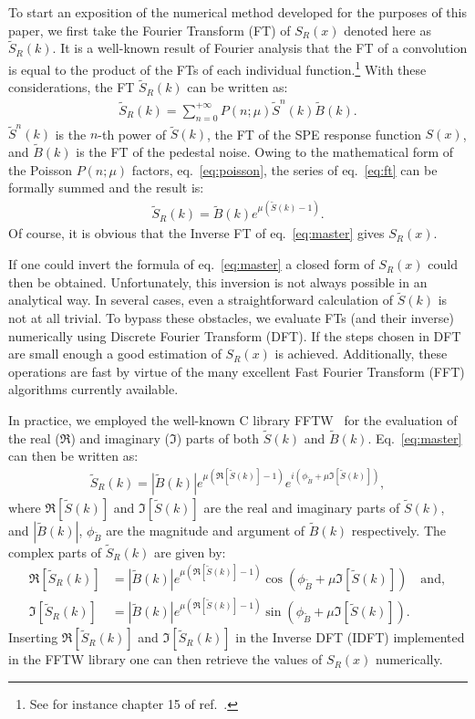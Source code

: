 \documentclass[a4paper,11pt]{article}
\begin{document}
To start an exposition of the numerical method developed for the purposes of this paper, we first take the Fourier Transform (FT) of $S_R(x)$ denoted here as $\tilde S_R(k)$. 
It is a well-known result of Fourier analysis that the FT of a convolution is equal to the product of the FTs of each individual function.\footnote{%
See for instance chapter 15 of ref.~\cite{Arfken}. }
With these considerations, the FT $\tilde S_R(k)$ can be written as: 
\begin{align}
\tilde S_R(k) = \sum_{n=0}^{+\infty} P( n; \mu ) \tilde S^n(k)  \tilde B(k). 
\label{eq:ft}
\end{align}
$\tilde S^n(k)$ is the $n$-th power of $\tilde S(k)$, the FT of the SPE response function $S(x)$, and $ \tilde B(k)$ is the FT of the pedestal noise. 
Owing to the mathematical form of the Poisson $P( n; \mu )$ factors, eq.~\eqref{eq:poisson}, the series of eq.~\eqref{eq:ft} can be formally summed and the result is: 
\begin{align}
\tilde S_R(k) =\tilde B(k) e^{\mu ( \tilde S(k) - 1 )}. 
\label{eq:master}
\end{align}
Of course, it is obvious that the Inverse FT of eq.~\eqref{eq:master} gives $S_R(x)$. 

If one could invert the formula of eq.~\eqref{eq:master} a closed form of $S_R(x)$ could then be obtained. 
Unfortunately, this inversion is not always possible in an analytical way. 
In several cases, even a straightforward calculation of $\tilde S(k)$ is not at all trivial. 
To bypass these obstacles, we evaluate FTs (and their inverse) numerically using Discrete Fourier Transform (DFT). 
If the steps chosen in DFT are small enough a good estimation of $S_R(x)$ is achieved. 
Additionally, these operations are fast by virtue of the many excellent Fast Fourier Transform (FFT) algorithms currently available. 

In practice, we employed the well-known C library FFTW~\cite{fftw} for the evaluation of the real ($\Re$) and imaginary ($\Im$) parts of both $\tilde S(k)$ and $\tilde B(k)$.
Eq.~\eqref{eq:master} can then be written as: 
\begin{align}
\tilde S_R(k) = | \tilde B(k) | e^{ \mu ( \Re[ \tilde S(k) ] - 1 ) }   e^{i ( \phi_{\tilde B} + \mu \Im[\tilde S(k) ] )}, 
\label{eq:master2}
\end{align} 
where $\Re[ \tilde S(k) ]$ and $\Im[ \tilde S(k) ]$ are the real and imaginary parts of $\tilde S(k)$, and $| \tilde B(k) |$, $\phi_{\tilde B}$ are the magnitude and argument of $\tilde B(k)$ respectively. 
The complex parts of $\tilde S_R(k)$ are given by:
\begin{align}
\Re[\tilde S_R(k) ] & = | \tilde B(k) |  e^{ \mu ( \Re[ \tilde S(k) ] - 1 ) }  \cos( \phi_{\tilde B }+ \mu \Im[\tilde S(k) ] ) \quad \text{and}, \\
\Im[\tilde S_R(k) ] & =  | \tilde B(k) | e^{ \mu ( \Re[ \tilde S(k) ] - 1 ) }  \sin( \phi_{\tilde B } + \mu \Im[\tilde S(k) ] ). 
\label{eq:parts}
\end{align} 
Inserting $\Re [ \tilde S_R(k) ]$ and  $\Im [ \tilde S_R(k) ]$ in the Inverse DFT (IDFT) implemented in the FFTW library one can then retrieve the values of $S_R(x)$ numerically. 
\end{document}
